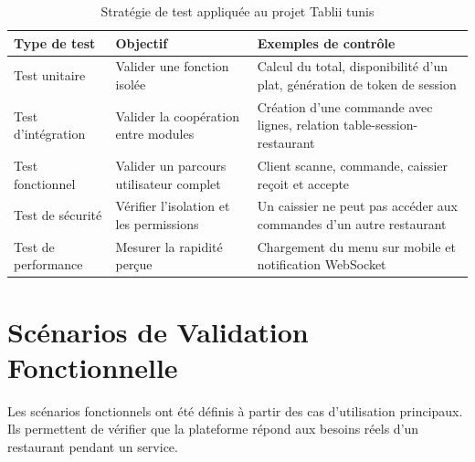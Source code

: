 \documentclass[12pt,a4paper]{report}
\begin{document}
\begin{table}[H]
    \centering
    \begin{tabularx}{\textwidth}{l X X}
        \toprule
        \rowcolor{secondary!10}
        \textbf{Type de test} & \textbf{Objectif} & \textbf{Exemples de contrôle} \\
        \midrule
        Test unitaire & Valider une fonction isolée & Calcul du total, disponibilité d'un plat, génération de token de session \\
        Test d'intégration & Valider la coopération entre modules & Création d'une commande avec lignes, relation table-session-restaurant \\
        Test fonctionnel & Valider un parcours utilisateur complet & Client scanne, commande, caissier reçoit et accepte \\
        Test de sécurité & Vérifier l'isolation et les permissions & Un caissier ne peut pas accéder aux commandes d'un autre restaurant \\
        Test de performance & Mesurer la rapidité perçue & Chargement du menu sur mobile et notification WebSocket \\
        \bottomrule
    \end{tabularx}
    \caption{Stratégie de test appliquée au projet Tablii tunis}
    \label{tab:test-strategy}
\end{table}

\section{Scénarios de Validation Fonctionnelle}

Les scénarios fonctionnels ont été définis à partir des cas d'utilisation principaux. Ils permettent de vérifier que la plateforme répond aux besoins réels d'un restaurant pendant un service.
\end{document}
